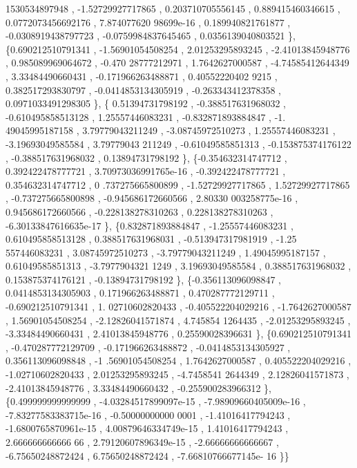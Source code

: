 \begin{DoxyCode}
      1530534897948 , -1.52729927717865 , 0.203710705556145 , 0.889415460346615 , 0.0772073456692176 , 7.874077620
      98699e-16 , 0.189940821761877 , -0.0308919438797723 , -0.0759984837645465 , 0.0356139040803521 \},
\{0.690212510791341 , -1.56901054508254 ,  2.01253295893245 , -2.41013845948776 , 0.985089969064672 , -0.470
      28777212971 ,   1.7642627000587 , -4.74585412644349 ,  3.33484490660431 , -0.171966263488871 , 0.40552220402
      9215 , 0.382517293830797 , -0.0414853134305919 , -0.263343412378358 , 0.0971033491298305 \},
\{ 0.51394731798192 , -0.388517631968032 , -0.610495858513128 ,  1.25557446083231 , -0.832871893884847 , -1.
      49045995187158 ,  3.79779043211249 , -3.08745972510273 ,  1.25557446083231 , -3.19693049585584 ,  3.79779043
      211249 , -0.61049585851313 , -0.153875374176122 , -0.388517631968032 ,  0.13894731798192 \},
\{-0.354632314747712 , 0.392422478777721 , 3.70973036991765e-16 , -0.392422478777721 , 0.354632314747712 , 0
      .737275665800899 , -1.52729927717865 ,  1.52729927717865 , -0.737275665800898 , -0.945686172660566 , 2.80330
      003258775e-16 , 0.945686172660566 , -0.228138278310263 , 0.228138278310263 , -6.30133847616635e-17 \},
\{0.832871893884847 , -1.25557446083231 , 0.610495858513128 , 0.388517631968031 , -0.513947317981919 , -1.25
      557446083231 ,  3.08745972510273 , -3.79779043211249 ,  1.49045995187157 ,  0.61049585851313 , -3.7977904321
      1249 ,  3.19693049585584 , 0.388517631968032 , 0.153875374176121 , -0.13894731798192 \},
\{-0.356113096098847 , 0.0414853134305903 , 0.171966263488871 , 0.470287772129711 , -0.690212510791341 ,  1.
      02710602820433 , -0.405522204029216 ,  -1.7642627000587 ,  1.56901054508254 , -2.12826041571874 ,   4.745854
      1264435 , -2.01253295893245 , -3.33484490660431 ,  2.41013845948776 ,  0.25590028396631 \},
\{0.690212510791341 , -0.470287772129709 , -0.171966263488872 , -0.0414853134305927 , 0.356113096098848 , -1
      .56901054508254 ,   1.7642627000587 , 0.405522204029216 , -1.02710602820433 ,  2.01253295893245 , -4.7458541
      2644349 ,  2.12826041571873 , -2.41013845948776 ,  3.33484490660432 , -0.255900283966312 \},
\{0.499999999999999 , -4.03284517899097e-15 , -7.98909660405009e-16 , -7.83277583383715e-16 , -0.50000000000
      0001 , -1.41016417794243 , -1.6800765870961e-15 , 4.00879646334749e-15 ,  1.41016417794243 ,  2.666666666666
      66 , 2.79120607896349e-15 , -2.66666666666667 , -6.75650248872424 ,  6.75650248872424 , -7.66810766677145e-
      16 \}\}
\end{DoxyCode}
\mbox{\label{a00515_a0d83f56b559ca5d47e6c6667c03a1ef3}} 
